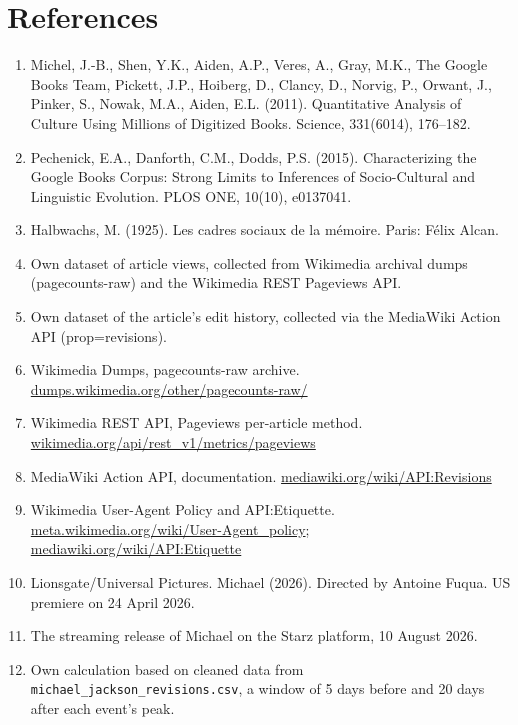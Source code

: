 \documentclass[11pt]{article}
\begin{document}
\section*{References}
\begin{enumerate}
\setlength{\itemsep}{4pt}
\item Michel, J.-B., Shen, Y.K., Aiden, A.P., Veres, A., Gray, M.K., The Google Books Team, Pickett, J.P., Hoiberg, D., Clancy, D., Norvig, P., Orwant, J., Pinker, S., Nowak, M.A.,  Aiden, E.L. (2011). Quantitative Analysis of Culture Using Millions of Digitized Books. Science, 331(6014), 176--182.
\item Pechenick, E.A., Danforth, C.M.,  Dodds, P.S. (2015). Characterizing the Google Books Corpus: Strong Limits to Inferences of Socio-Cultural and Linguistic Evolution. PLOS ONE, 10(10), e0137041.
\item Halbwachs, M. (1925). Les cadres sociaux de la mémoire. Paris: Félix Alcan.
\item Own dataset of article views, collected from Wikimedia archival dumps (pagecounts-raw) and the Wikimedia REST Pageviews API.
\item Own dataset of the article's edit history, collected via the MediaWiki Action API (prop=revisions).
\item Wikimedia Dumps, pagecounts-raw archive. \url{dumps.wikimedia.org/other/pagecounts-raw/}
\item Wikimedia REST API, Pageviews per-article method. \url{wikimedia.org/api/rest_v1/metrics/pageviews}
\item MediaWiki Action API, documentation. \url{mediawiki.org/wiki/API:Revisions}
\item Wikimedia User-Agent Policy and API:Etiquette. \url{meta.wikimedia.org/wiki/User-Agent_policy}; \url{mediawiki.org/wiki/API:Etiquette}
\item Lionsgate/Universal Pictures. Michael (2026). Directed by Antoine Fuqua. US premiere on 24 April 2026.
\item The streaming release of Michael on the Starz platform, 10 August 2026.
\item Own calculation based on cleaned data from \texttt{michael\_jackson\_revisions.csv}, a window of 5 days before and 20 days after each event's peak.
\end{enumerate}
\end{document}
